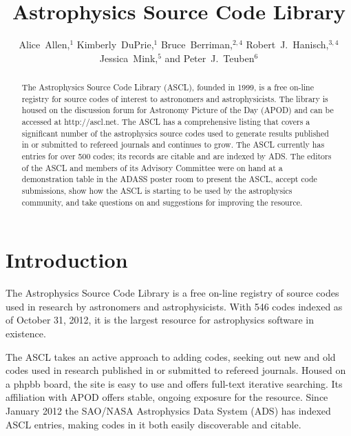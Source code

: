 
\resetcounters


\title{Astrophysics Source Code Library}

\author{Alice~Allen,$^1$ Kimberly~DuPrie,$^1$ Bruce~Berriman,$^{2,4}$ Robert~J.~Hanisch,$^{3,4}$ Jessica~Mink,$^5$ and Peter~J.~Teuben$^6$
}


\begin{abstract}

The Astrophysics Source Code Library (ASCL), founded in 1999, is a free on-line registry for source codes of interest to astronomers and astrophysicists. The library is housed on the discussion forum for Astronomy Picture of the Day (APOD) and can be accessed at http://ascl.net. The ASCL has a comprehensive listing that covers a significant number of the astrophysics source codes used to generate results published in or submitted to refereed journals and continues to grow. The ASCL currently has entries for over 500 codes; its records are citable and are indexed by ADS. The editors of the ASCL and members of its Advisory Committee were on hand at a demonstration table in the ADASS poster room to present the ASCL, accept code submissions, show how the ASCL is starting to be used by the astrophysics community, and take questions on and suggestions for improving the resource.
\end{abstract}

\section{Introduction}

The Astrophysics Source Code Library is a free on-line registry of source codes used in research by astronomers and astrophysicists. With 546 codes indexed as of October 31, 2012, it is the largest resource for astrophysics software in existence. 

The ASCL takes an active approach to adding codes, seeking out new and old codes used in research published in or submitted to refereed journals. Housed on a phpbb board, the site is easy to use and offers full-text iterative searching. Its affiliation with APOD offers stable, ongoing exposure for the resource. Since January 2012 the SAO/NASA Astrophysics Data System (ADS) has indexed ASCL entries, making codes in it both easily discoverable and citable.

